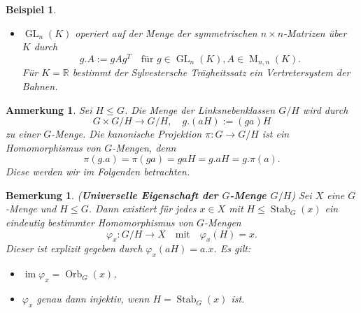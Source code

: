 \documentclass[a4paper, twoside, 11pt, ngerman]{report}
\DeclareMathOperator{\GL}{GL}
\DeclareMathOperator{\image}{im}
\DeclareMathOperator{\Mat}{M}
\DeclareMathOperator{\Orb}{Orb}
\DeclareMathOperator{\Stab}{Stab}
\theoremstyle{definistyle}
\newtheorem{bem}[satz]{Bemerkung}
\newtheorem{anm}[satz]{Anmerkung}
\newtheorem{bsp}[satz]{Beispiel}
\theoremstyle{remark}
\newcommand{\defn}[1]{\textit{\bfseries #1}}
\begin{document}
\begin{bsp}
\begin{enumerate}[label=(\alph*)]
\begin{itemize}
    \item $\GL_n(K)$ operiert auf der Menge der symmetrischen $n \times n$-Matrizen über $K$ durch 
    \[g . A := g A g^T \quad \text{für } g\in\GL_n(K), A\in\Mat_{n,n}(K).\]
    Für $K = \mathbb{R}$ bestimmt der Sylvestersche Trägheitssatz ein Vertretersystem der Bahnen.
    \end{itemize}    
\end{enumerate}
\end{bsp}

\begin{anm}\label{anm:linkskoseten}
Sei $H \leq G$. Die Menge der Linksnebenklassen $G / H$ wird durch 
\[
G \times G / H \to G / H, \quad g . (a H) := (g a) H
\]
zu einer $G$-Menge. Die kanonische Projektion $\pi \colon G \to G / H$ ist ein Homomorphismus von $G$-Mengen, denn
\[
\pi(g . a) = \pi(g a) = g a H = g.aH = g . \pi(a).
\]
Diese werden wir im Folgenden betrachten.
\end{anm}

\begin{bem}\label{bem:univ_eig_g_menge}
(\defn{Universelle Eigenschaft der $G$-Menge $G / H$}) Sei $X$ eine $G$-Menge und $H \leq G$. Dann existiert für jedes $x \in X$ mit $H \leq \Stab_G(x)$ ein eindeutig bestimmter Homomorphismus von $G$-Mengen
\[
\varphi_x \colon G / H \to X \quad \text{mit} \quad \varphi_x(H) = x.
\]
Dieser ist explizit gegeben durch $\varphi_x(a H) = a . x$. Es gilt: 
\begin{itemize}
\item $\image \varphi_x = \Orb_G(x)$,
\item $\varphi_x$ genau dann injektiv, wenn $H = \Stab_G(x)$ ist.
\end{itemize}
\end{bem}
\end{document}
